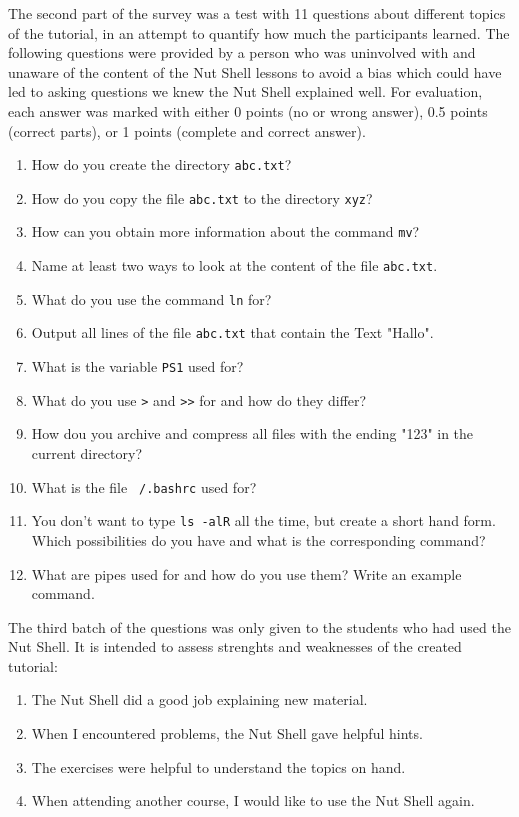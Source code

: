 \documentclass[paper=a4,twoside,abstract=on,cleardoublepage=empty,numbers=noenddot,toc=bib,12pt,appendixprefix=true]{scrreprt}
\begin{document}
The second part of the survey was a test with 11 questions about different topics of the tutorial, in an attempt to quantify how much the participants learned. The following questions were provided by a person who was uninvolved with and unaware of the content of the Nut Shell lessons to avoid a bias which could have led to asking questions we knew the Nut Shell explained well. For evaluation, each answer was marked with either 0 points (no or wrong answer), 0.5 points (correct parts), or 1 points (complete and correct answer).

\begin{enumerate}
    \item How do you create the directory \texttt{abc.txt}?
    \item How do you copy the file \texttt{abc.txt} to the directory \texttt{xyz}?
    \item How can you obtain more information about the command \texttt{mv}?
    \item Name at least two ways to look at the content of the file \texttt{abc.txt}.
    \item What do you use the command \texttt{ln} for?
    \item Output all lines of the file \texttt{abc.txt} that contain the Text "Hallo".
    \item What is the variable \texttt{PS1} used for?
    \item What do you use \texttt{>} and \texttt{>>} for and how do they differ?
    \item How dou you archive and compress all files with the ending "123" in the current directory?
    \item What is the file \texttt{~/.bashrc} used for?
    \item You don't want to type \texttt{ls -alR} all the time, but create a short hand form. Which possibilities do you have and what is the corresponding command?
    \item What are pipes used for and how do you use them? Write an example command.
\end{enumerate}

The third batch of the questions was only given to the students who had used the Nut Shell. It is intended to assess strenghts and weaknesses of the created tutorial:

\begin{enumerate}
    \item The Nut Shell did a good job explaining new material.
    \item When I encountered problems, the Nut Shell gave helpful hints.
    \item The exercises were helpful to understand the topics on hand.
    \item When attending another course, I would like to use the Nut Shell again.
\end{enumerate}
\end{document}
